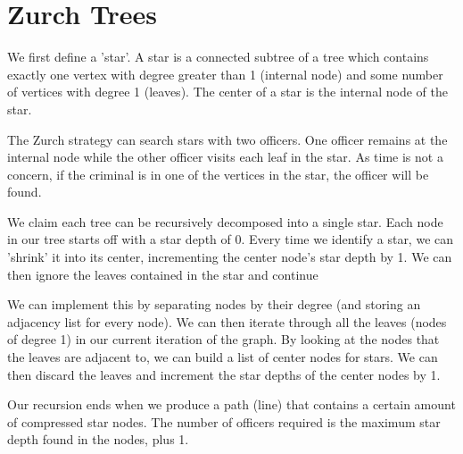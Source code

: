 \documentclass{article}
\begin{document}
\section{Zurch Trees}
We first define a 'star'. A star is a connected subtree of a tree which contains exactly one vertex with degree greater than 1 (internal node) and some number of vertices with degree 1 (leaves). The center of a star is the internal node of the star.
\par 
The Zurch strategy can search stars with two officers. One officer remains at the internal node while the other officer visits each leaf in the star. As time is not a concern, if the criminal is in one of the vertices in the star, the officer will be found.
\par 
We claim each tree can be recursively decomposed into a single star. Each node in our tree starts off with a star depth of 0. Every time we identify a star, we can 'shrink' it into its center, incrementing the center node's star depth by 1. We can then ignore the leaves contained in the star and continue
\par 
We can implement this by separating nodes by their degree (and storing an adjacency list for every node). We can then iterate through all the leaves (nodes of degree 1) in our current iteration of the graph. By looking at the nodes that the leaves are adjacent to, we can build a list of center nodes for stars. We can then discard the leaves and increment the star depths of the center nodes by 1.
\par 
Our recursion ends when we produce a path (line) that contains a certain amount of compressed star nodes. The number of officers required is the maximum star depth found in the nodes, plus 1.
\end{document}
